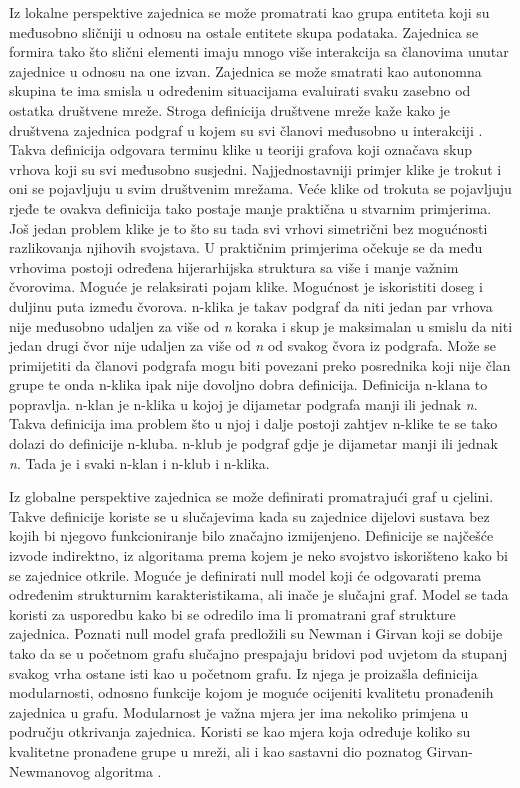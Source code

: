 \documentclass[times, utf8, diplomski]{fer}
\begin{document}
Iz lokalne perspektive zajednica se može promatrati kao grupa entiteta koji su međusobno sličniji u odnosu na ostale entitete skupa podataka. Zajednica se formira tako što slični elementi imaju mnogo više interakcija sa članovima unutar zajednice u odnosu na one izvan. Zajednica se može smatrati kao autonomna skupina te ima smisla u određenim situacijama evaluirati svaku zasebno od ostatka društvene mreže. Stroga definicija društvene mreže kaže kako je društvena zajednica podgraf u kojem su svi članovi međusobno u interakciji \cite{luce1949method}. Takva definicija odgovara terminu klike u teoriji grafova koji označava skup vrhova koji su svi međusobno susjedni. Najjednostavniji primjer klike je trokut i oni se pojavljuju u svim društvenim mrežama. Veće klike od trokuta se pojavljuju rjeđe te ovakva definicija tako postaje manje praktična u stvarnim primjerima. Još jedan problem klike je to što su tada svi vrhovi simetrični bez mogućnosti razlikovanja njihovih svojstava. U praktičnim primjerima očekuje se da među vrhovima postoji određena hijerarhijska struktura sa više i manje važnim čvorovima. Moguće je relaksirati pojam klike. Mogućnost je iskoristiti doseg i duljinu puta između čvorova. n-klika je takav podgraf da niti jedan par vrhova nije međusobno udaljen za više od \textit{n} koraka i skup je maksimalan u smislu da niti jedan drugi čvor nije udaljen za više od \textit{n} od svakog čvora iz podgrafa. Može se primijetiti da članovi podgrafa mogu biti povezani preko posrednika koji nije član grupe te onda n-klika ipak nije dovoljno dobra definicija. Definicija n-klana to popravlja. n-klan je n-klika u kojoj je dijametar podgrafa manji ili jednak \textit{n}. Takva definicija ima problem što u njoj i dalje postoji zahtjev n-klike te se tako dolazi do definicije n-kluba. n-klub je podgraf gdje je dijametar manji ili jednak \textit{n}. Tada je i svaki n-klan i n-klub i n-klika.

Iz globalne perspektive zajednica se može definirati promatrajući graf u cjelini. Takve definicije koriste se u slučajevima kada su zajednice dijelovi sustava bez kojih bi njegovo funkcioniranje bilo značajno izmijenjeno. Definicije se najčešće izvode indirektno, iz algoritama prema kojem je neko svojstvo iskorišteno kako bi se zajednice otkrile. Moguće je definirati null model koji će odgovarati prema određenim strukturnim karakteristikama, ali inače je slučajni graf. Model se tada koristi za usporedbu kako bi se odredilo ima li promatrani graf strukture zajednica. Poznati null model grafa predložili su Newman i Girvan koji se dobije tako da se u početnom grafu slučajno prespajaju bridovi pod uvjetom da stupanj svakog vrha ostane isti kao u početnom grafu. Iz njega je proizašla definicija modularnosti, odnosno funkcije kojom je moguće ocijeniti kvalitetu pronađenih zajednica u grafu. Modularnost je važna mjera jer ima nekoliko primjena u području otkrivanja zajednica. Koristi se kao mjera koja određuje koliko su kvalitetne pronađene grupe u mreži, ali i kao sastavni dio poznatog Girvan-Newmanovog algoritma \cite{fortunato2010community}.
\end{document}
